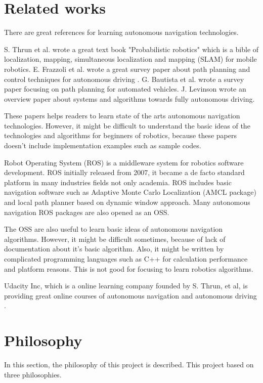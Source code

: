 \documentclass{bmvc2k}
\begin{document}
\section{Related works}

There are great references for learning autonomous navigation technologies.

S. Thrun et al. wrote a great text book "Probabilistic robotics" which is a bible of localization, mapping, simultaneous localization and mapping (SLAM) for mobile robotics\cite{PR}.
E. Frazzoli et al. wrote a great survey paper about path planning and control techniques for autonomous driving \cite{pathtracking}.
G. Bautista et al. wrote a survey paper focusing on path planning for automated vehicles\cite{pathplanning}.
J. Levinson wrote an overview paper about systems and algorithms towards fully autonomous driving\cite{Levinson2011}.

These papers helps readers to learn state of the arts autonomous navigation technologies.
However, it might be difficult to understand the basic ideas of the technologies and algorithms for beginners of robotics, because these papers doesn't include implementation examples such as sample codes.

Robot Operating System (ROS) is a middleware system for robotics software development\cite{ros}\cite{rospaper}.
ROS initially released from 2007, it became a de facto standard platform in many industries fields not only academia.
ROS includes basic navigation software such as Adaptive Monte Carlo Localization (AMCL package) and local path planner based on dynamic window approach\cite{rosnavigation}.
Many autonomous navigation ROS packages are also opened as an OSS.

The OSS are also useful to learn basic ideas of autonomous navigation algorithms.
However, it might be difficult sometimes, because of lack of documentation about it's basic algorithm.
Also, it might be written by complicated programming languages such as C++ for calculation performance and platform reasons.
This is not good for focusing to learn robotics algorithms.

Udacity Inc, which is a online learning company founded by S. Thrun, et al, is providing great online courses of autonomous navigation and autonomous driving \cite{udacity}.



\section{Philosophy}
In this section, the philosophy of this project is described.
This project based on three philosophies.
\end{document}
